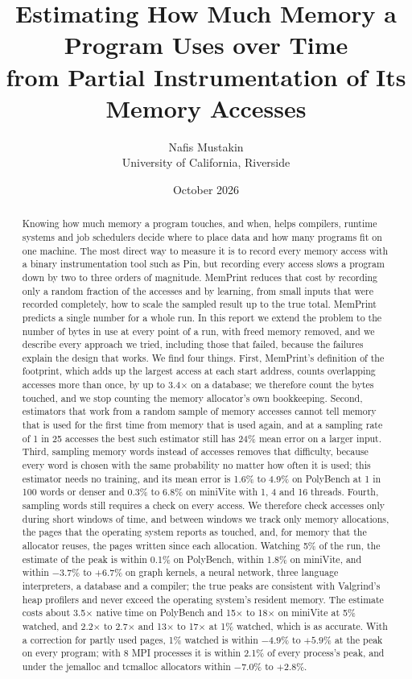 \documentclass[11pt]{article}
\title{Estimating How Much Memory a Program Uses over Time\\from Partial Instrumentation of Its Memory Accesses}
\author{Nafis Mustakin\\University of California, Riverside}
\date{October 2026}
\newcommand{\memprint}{MemPrint}
\begin{document}
\maketitle

\begin{abstract}
Knowing how much memory a program touches, and when, helps compilers, runtime systems and job schedulers decide where to place data and how many programs fit on one machine. The most direct way to measure it is to record every memory access with a binary instrumentation tool such as Pin, but recording every access slows a program down by two to three orders of magnitude. \memprint{} reduces that cost by recording only a random fraction of the accesses and by learning, from small inputs that were recorded completely, how to scale the sampled result up to the true total. \memprint{} predicts a single number for a whole run. In this report we extend the problem to the number of bytes in use at every point of a run, with freed memory removed, and we describe every approach we tried, including those that failed, because the failures explain the design that works. We find four things. First, \memprint{}'s definition of the footprint, which adds up the largest access at each start address, counts overlapping accesses more than once, by up to 3.4$\times$ on a database; we therefore count the bytes touched, and we stop counting the memory allocator's own bookkeeping. Second, estimators that work from a random sample of memory accesses cannot tell memory that is used for the first time from memory that is used again, and at a sampling rate of 1 in 25 accesses the best such estimator still has 24\% mean error on a larger input. Third, sampling memory words instead of accesses removes that difficulty, because every word is chosen with the same probability no matter how often it is used; this estimator needs no training, and its mean error is 1.6\% to 4.9\% on PolyBench at 1 in 100 words or denser and 0.3\% to 6.8\% on miniVite with 1, 4 and 16 threads. Fourth, sampling words still requires a check on every access. We therefore check accesses only during short windows of time, and between windows we track only memory allocations, the pages that the operating system reports as touched, and, for memory that the allocator reuses, the pages written since each allocation. Watching 5\% of the run, the estimate of the peak is within 0.1\% on PolyBench, within 1.8\% on miniVite, and within $-3.7\%$ to $+6.7\%$ on graph kernels, a neural network, three language interpreters, a database and a compiler; the true peaks are consistent with Valgrind's heap profilers and never exceed the operating system's resident memory. The estimate costs about 3.5$\times$ native time on PolyBench and 15$\times$ to 18$\times$ on miniVite at 5\% watched, and 2.2$\times$ to 2.7$\times$ and 13$\times$ to 17$\times$ at 1\% watched, which is as accurate. With a correction for partly used pages, 1\% watched is within $-4.9\%$ to $+5.9\%$ at the peak on every program; with 8 MPI processes it is within 2.1\% of every process's peak, and under the jemalloc and tcmalloc allocators within $-7.0\%$ to $+2.8\%$.
\end{abstract}
\end{document}
